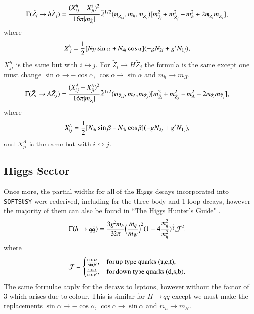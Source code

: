 \documentclass[final,3p,times,pdflatex]{elsarticle}
\begin{document}
\begin{equation}\label{neuthneut}
\Gamma (\tilde{Z}_i \rightarrow h \tilde{Z}_{j}) = {(X_{ij}^{h} + X_{ji}^{h})^2 \over 16\pi |m_{\tilde{Z}_i}|} \tilde{\lambda}^{1/2} (m_{\tilde{Z}_ij}, m_{h}, m_{\tilde{Z}_{j}}) [m_{\tilde{Z}_{i}}^2 + m_{\tilde{Z}_j}^2 -m_{h}^2 +2m_{\tilde{Z}_i}m_{\tilde{Z}_j}],
\end{equation} 
where
\begin{equation} \label{Xijh}
X_{ij}^{h} = {1 \over 2} [N_{3i} \sin \alpha + N_{4i}\cos \alpha] (-g N_{2j} + g' N_{1j}),
\end{equation}
$X_{ji}^{h}$ is the same but with $i \leftrightarrow j$.
For $\tilde{Z}_i \rightarrow H \tilde{Z}_j$ the formula is the same except one must change $\sin\alpha \rightarrow -\cos\alpha$, $\cos\alpha \rightarrow \sin\alpha$ and $m_h \rightarrow m_H$.
\begin{equation}\label{neutAneut}
\Gamma (\tilde{Z}_i \rightarrow A \tilde{Z}_{j}) = {(X_{ij}^{A} + X_{ji}^{A})^2 \over 16\pi |m_{\tilde{Z}_i}|} \tilde{\lambda}^{1/2} (m_{\tilde{Z}_ij}, m_{A}, m_{\tilde{Z}_{j}}) [m_{\tilde{Z}_{i}}^2 + m_{\tilde{Z}_j}^2 -m_{A}^2 -2m_{\tilde{Z}_i}m_{\tilde{Z}_j}],
\end{equation} 
where
\begin{equation} \label{XijA}
X_{ij}^{A} = {1 \over 2} [N_{3i} \sin \beta - N_{4i} \cos \beta] (-gN_{2j} + g'N_{1j}),
\end{equation}
and $X_{ji}^{A}$ is the same but with $i \leftrightarrow j$.

\subsection{Higgs Sector} \label{Higgs_Sector}

Once more, the partial widths for all of the Higgs decays incorporated into {\tt SOFTSUSY} were rederived, including for the three-body and 1-loop decays, however the majority of them can also be found in ``The Higgs Hunter's Guide" \cite{HHG}.
\begin{equation}\label{hqq}
\Gamma (h \rightarrow q \bar{q}) = {3g^2 m_h \over 32\pi} \Big({m_q \over m_W}\Big)^2 (1-4{m_q^2 \over m_h^2})^{3 \over 2} \mathcal{J}^2, 
\end{equation} 
where
\begin{equation}
\mathcal{J}=\begin{cases}
    {\cos \alpha \over \sin \beta}, & \text{for up type quarks (u,c,t)},\\
    {\sin \alpha \over \cos \beta}, & \text{for down type quarks (d,s,b)}.
  \end{cases}
\end{equation}
The same formulae apply for the decays to leptons, however without the factor of 3 which arises due to colour.
This is similar for $H \rightarrow qq$ except we must make the replacements $\sin\alpha \rightarrow -\cos\alpha$, $\cos\alpha \rightarrow \sin\alpha$ and $m_h \rightarrow m_H$.
\end{document}
